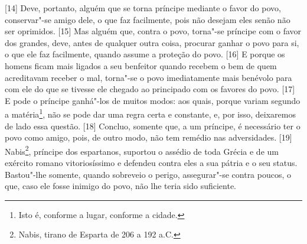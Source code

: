 {[}14{]} Deve, portanto, alguém que se torna príncipe mediante o favor
do povo, conservar"-se amigo dele, o que faz facilmente, pois não desejam
eles senão não ser oprimidos. {[}15{]} Mas alguém que, contra o povo,
torna"-se príncipe com o favor dos grandes, deve, antes de qualquer outra
coisa, procurar ganhar o povo para si, o que ele faz facilmente, quando
assume a proteção do povo. {[}16{]} E porque os homens ficam mais
ligados a seu benfeitor quando recebem o bem de quem acreditavam receber
o mal, torna"-se o povo imediatamente mais benévolo para com ele do que
se tivesse ele chegado ao principado com os favores do povo. {[}17{]} E
pode o príncipe ganhá"-los de muitos modos: aos quais, porque variam
segundo a matéria\footnote{Isto é, conforme a lugar, conforme a cidade.},
não se pode dar uma regra certa e constante, e, por isso, deixaremos de
lado essa questão. {[}18{]} Concluo, somente que, a um príncipe, é
necessário ter o povo como amigo, pois, de outro modo, não tem remédio
nas adversidades. {[}19{]} Nabis\footnote{Nabis, tirano de Esparta de
  206 a 192 a.C.}, príncipe dos espartanos, suportou o assédio de toda
Grécia e de um exército romano vitoriosíssimo e defendeu contra eles a
sua pátria e o seu status. Bastou"-lhe somente, quando sobreveio o
perigo, assegurar"-se contra poucos, o que, caso ele fosse inimigo do
povo, não lhe teria sido suficiente.

